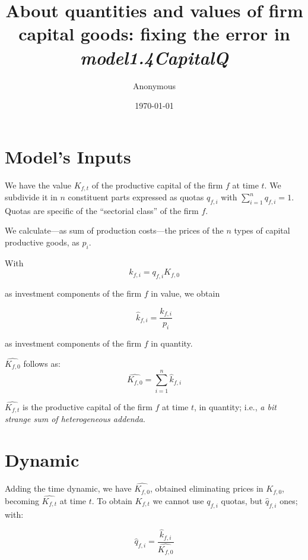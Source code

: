 \documentclass[]{amsart} %
\title{About quantities and values of firm capital goods: fixing the error in \emph{model1.4CapitalQ}}
\author{Anonymous}
\date{\today}                                           %
\begin{document}
\maketitle

\section{Model's Inputs}

We have the value $K_{f,t}$ of the productive capital of the firm $f$ at time $t$. We subdivide it in $n$ constituent parts expressed as quotas $q_{f,i}$ with $\sum_{i=1}^{n} 
q_{f,i} = 1$. Quotas are specific of the ``sectorial class'' of the firm $f$.

We calculate---as sum of production costs---the prices of the $n$ types of capital productive goods, as $p_i$.

With 
\begin{equation}
k_{f,i} = q_{f,i}  K_{f,0}
\label{vAddenda}
\end{equation} 

as investment components of the firm $f$ in value, we obtain 

\begin{equation}
\hat{k}_{f,i} =  \frac{k_{f,i}}{p_i} 
\label{qAddenda}
\end{equation} 

as investment components of the firm $f$ in quantity.

$\hat{K_{f,0}}$ follows as:
\begin{equation}
\hat{K_{f,0}} = \sum_{i=1}^{n}  \hat{k}_{f,i} 
\label{hatK}
\end{equation} 


$\hat{K_{f,t}}$ is the productive capital of the firm $f$ at time $t$, in quantity; i.e., \emph{a bit strange sum of heterogeneous addenda}.

\section{Dynamic}

Adding the time dynamic, we have $\hat{K_{f,0}}$, obtained eliminating prices in  $K_{f,0}$, becoming $\hat{K_{f,t}}$ at time $t$.
To obtain $K_{f,t}$ we cannot use $q_{f,i}$ quotas, but $\hat{q}_{f,i}$ ones; with:

\begin{equation}
\hat{q}_{f,i}=\frac{\hat{k}_{f,i} }{\hat{K_{f,0}}}
\label{qQuotas}
\end{equation} 
\end{document}
